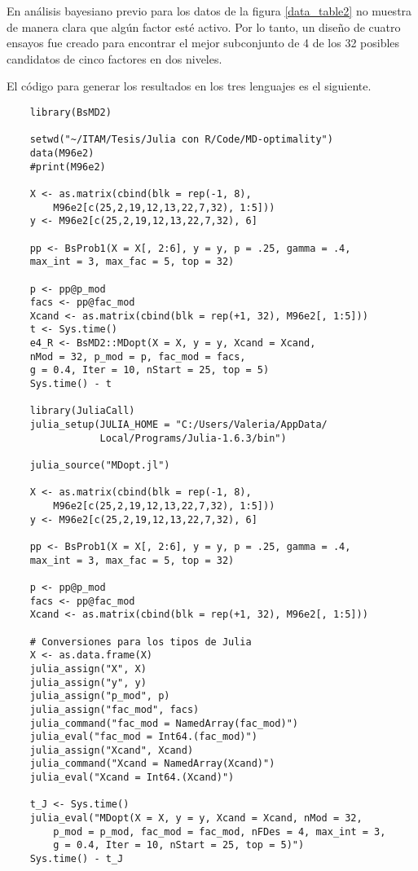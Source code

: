 En análisis bayesiano previo para los datos de la figura \ref{data_table2} no muestra de manera clara que algún factor esté activo. Por lo tanto, un diseño de cuatro ensayos fue creado para encontrar el mejor subconjunto de 4 de los 32 posibles candidatos de cinco factores en dos niveles. 

El código para generar los resultados en los tres lenguajes es el siguiente.

\begin{verbatim}
	library(BsMD2)
	
	setwd("~/ITAM/Tesis/Julia con R/Code/MD-optimality")
	data(M96e2)
	#print(M96e2)
	
	X <- as.matrix(cbind(blk = rep(-1, 8), 
		M96e2[c(25,2,19,12,13,22,7,32), 1:5]))
	y <- M96e2[c(25,2,19,12,13,22,7,32), 6]
	
	pp <- BsProb1(X = X[, 2:6], y = y, p = .25, gamma = .4, 
	max_int = 3, max_fac = 5, top = 32)
	
	p <- pp@p_mod
	facs <- pp@fac_mod
	Xcand <- as.matrix(cbind(blk = rep(+1, 32), M96e2[, 1:5]))
	t <- Sys.time()
	e4_R <- BsMD2::MDopt(X = X, y = y, Xcand = Xcand, 
	nMod = 32, p_mod = p, fac_mod = facs, 
	g = 0.4, Iter = 10, nStart = 25, top = 5)
	Sys.time() - t
	
	library(JuliaCall)
	julia_setup(JULIA_HOME = "C:/Users/Valeria/AppData/
				Local/Programs/Julia-1.6.3/bin")
	
	julia_source("MDopt.jl")
	
	X <- as.matrix(cbind(blk = rep(-1, 8), 
		M96e2[c(25,2,19,12,13,22,7,32), 1:5]))
	y <- M96e2[c(25,2,19,12,13,22,7,32), 6]
	
	pp <- BsProb1(X = X[, 2:6], y = y, p = .25, gamma = .4, 
	max_int = 3, max_fac = 5, top = 32)
	
	p <- pp@p_mod
	facs <- pp@fac_mod
	Xcand <- as.matrix(cbind(blk = rep(+1, 32), M96e2[, 1:5]))
	
	# Conversiones para los tipos de Julia
	X <- as.data.frame(X)
	julia_assign("X", X)
	julia_assign("y", y)
	julia_assign("p_mod", p)
	julia_assign("fac_mod", facs)
	julia_command("fac_mod = NamedArray(fac_mod)")
	julia_eval("fac_mod = Int64.(fac_mod)")
	julia_assign("Xcand", Xcand)
	julia_command("Xcand = NamedArray(Xcand)")
	julia_eval("Xcand = Int64.(Xcand)")
	
	t_J <- Sys.time()
	julia_eval("MDopt(X = X, y = y, Xcand = Xcand, nMod = 32, 
		p_mod = p_mod, fac_mod = fac_mod, nFDes = 4, max_int = 3, 
		g = 0.4, Iter = 10, nStart = 25, top = 5)")
	Sys.time() - t_J
	

\end{verbatim}
